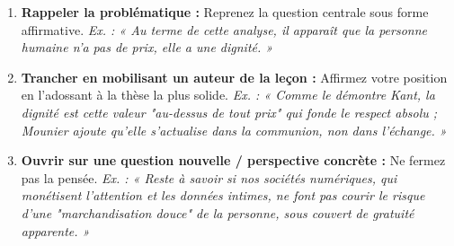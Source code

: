 \documentclass[11pt]{article}
\begin{document}
\begin{methode}
\begin{enumerate}
    \item \textbf{Rappeler la problématique :} Reprenez la question centrale sous forme affirmative. \emph{Ex. : « Au terme de cette analyse, il apparaît que la personne humaine n'a pas de prix, elle a une dignité. »}
    \item \textbf{Trancher en mobilisant un auteur de la leçon :} Affirmez votre position en l'adossant à la thèse la plus solide. \emph{Ex. : « Comme le démontre Kant, la dignité est cette valeur "au-dessus de tout prix" qui fonde le respect absolu ; Mounier ajoute qu'elle s'actualise dans la communion, non dans l'échange. »}
    \item \textbf{Ouvrir sur une question nouvelle / perspective concrète :} Ne fermez pas la pensée. \emph{Ex. : « Reste à savoir si nos sociétés numériques, qui monétisent l'attention et les données intimes, ne font pas courir le risque d'une "marchandisation douce" de la personne, sous couvert de gratuité apparente. »}
\end{enumerate}
\end{methode}
\end{document}
